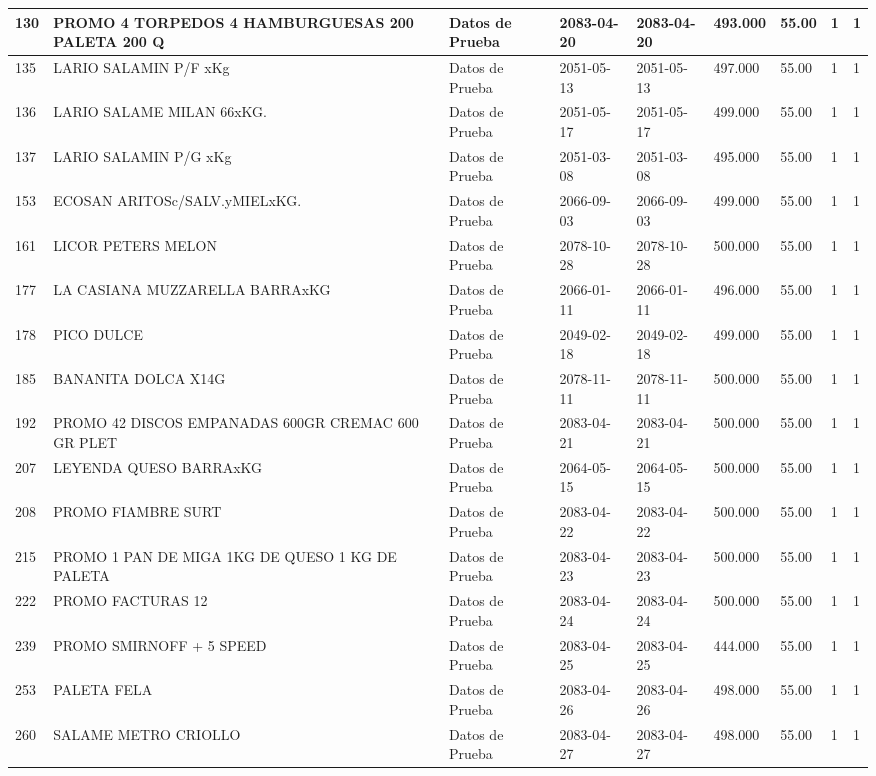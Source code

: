 \documentclass[a4paper,12pt]{article}
\begin{document}
\begin{landscape}
\begin{longtable}{|p{4cm}|p{2.5cm}|p{2.5cm}|p{1.8cm}|p{1.8cm}|p{1cm}|p{1cm}|p{3cm}|p{3cm}||}
130 & PROMO 4 TORPEDOS 4 HAMBURGUESAS 200 PALETA 200 Q & Datos de Prueba & 2083-04-20 & 2083-04-20 & 493.000 & 55.00 & 1 & 1 \\ \hline 
135 & LARIO SALAMIN P/F xKg & Datos de Prueba & 2051-05-13 & 2051-05-13 & 497.000 & 55.00 & 1 & 1 \\ \hline 
136 & LARIO SALAME MILAN 66xKG. & Datos de Prueba & 2051-05-17 & 2051-05-17 & 499.000 & 55.00 & 1 & 1 \\ \hline 
137 & LARIO SALAMIN P/G xKg & Datos de Prueba & 2051-03-08 & 2051-03-08 & 495.000 & 55.00 & 1 & 1 \\ \hline 
153 & ECOSAN ARITOSc/SALV.yMIELxKG. & Datos de Prueba & 2066-09-03 & 2066-09-03 & 499.000 & 55.00 & 1 & 1 \\ \hline 
161 & LICOR PETERS MELON & Datos de Prueba & 2078-10-28 & 2078-10-28 & 500.000 & 55.00 & 1 & 1 \\ \hline 
177 & LA CASIANA MUZZARELLA BARRAxKG & Datos de Prueba & 2066-01-11 & 2066-01-11 & 496.000 & 55.00 & 1 & 1 \\ \hline 
178 & PICO DULCE & Datos de Prueba & 2049-02-18 & 2049-02-18 & 499.000 & 55.00 & 1 & 1 \\ \hline 
185 & BANANITA DOLCA X14G & Datos de Prueba & 2078-11-11 & 2078-11-11 & 500.000 & 55.00 & 1 & 1 \\ \hline 
192 & PROMO 42 DISCOS EMPANADAS 600GR CREMAC 600 GR PLET & Datos de Prueba & 2083-04-21 & 2083-04-21 & 500.000 & 55.00 & 1 & 1 \\ \hline 
207 & LEYENDA QUESO BARRAxKG & Datos de Prueba & 2064-05-15 & 2064-05-15 & 500.000 & 55.00 & 1 & 1 \\ \hline 
208 & PROMO FIAMBRE SURT & Datos de Prueba & 2083-04-22 & 2083-04-22 & 500.000 & 55.00 & 1 & 1 \\ \hline 
215 & PROMO 1 PAN DE MIGA 1KG DE QUESO 1 KG DE PALETA & Datos de Prueba & 2083-04-23 & 2083-04-23 & 500.000 & 55.00 & 1 & 1 \\ \hline 
222 & PROMO FACTURAS 12 & Datos de Prueba & 2083-04-24 & 2083-04-24 & 500.000 & 55.00 & 1 & 1 \\ \hline 
239 & PROMO SMIRNOFF + 5 SPEED & Datos de Prueba & 2083-04-25 & 2083-04-25 & 444.000 & 55.00 & 1 & 1 \\ \hline 
253 & PALETA  FELA & Datos de Prueba & 2083-04-26 & 2083-04-26 & 498.000 & 55.00 & 1 & 1 \\ \hline 
260 & SALAME METRO CRIOLLO & Datos de Prueba & 2083-04-27 & 2083-04-27 & 498.000 & 55.00 & 1 & 1 \\ \hline 

\end{longtable}
\end{landscape}
\end{document}
